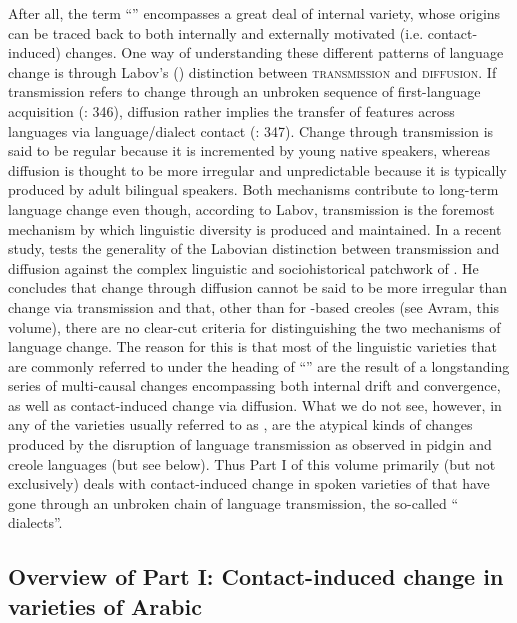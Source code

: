 \documentclass[output=paper]{langsci/langscibook}
\begin{document}
After all, the term ``'' encompasses a great deal of internal variety, whose origins can be traced back to both internally and externally motivated (i.e. con\-tact-induced) changes. One way of understanding these different patterns of {language change} is through Labov's (\citeyear{Labov2007}) distinction between \textsc{transmission} and \textsc{diffusion}. If {transmission} refers to change through an unbroken sequence of first-language acquisition (\citealt{Labov2007}: 346), {diffusion} rather implies the {transfer} of features across languages via language/{dialect contact} (\citealt{Labov2007}: 347). Change through {transmission} is said to be regular because it is incremented by young native speakers, whereas {diffusion} is thought to be more irregular and unpredictable because it is typically produced by adult bilingual speakers. Both mechanisms contribute to long-term {language change} even though, according to Labov, {transmission} is the foremost mechanism by which linguistic diversity is produced and maintained. In a recent study, \citet{Owens2018} tests the generality of the Labovian distinction between {transmission} and {diffusion} against the complex linguistic and sociohistorical patchwork of . He concludes that change through {diffusion} cannot be said to be more irregular than change via {transmission} and that, other than for -based creoles (see Avram, this volume), there are no clear-cut criteria for distinguishing the two mechanisms of {language change}. The reason for this is that most of the linguistic varieties that are commonly referred to under the heading of ``'' are the result of a longstanding series of multi-causal changes encompassing both internal drift and {convergence}, as well as contact-induced change via {diffusion}. What we do not see, however, in any of the varieties usually referred to as , are the atypical kinds of changes produced by the disruption of language {transmission} as observed in {pidgin} and {creole} languages (but see below). Thus Part I of this volume primarily (but not exclusively) deals with contact-induced change in spoken varieties of  that have gone through an unbroken chain of language {transmission}, the so-called `` dialects''.


\subsection{Overview of Part I: Contact-induced change in varieties of Arabic}\label{intropartIoverview}
\end{document}
